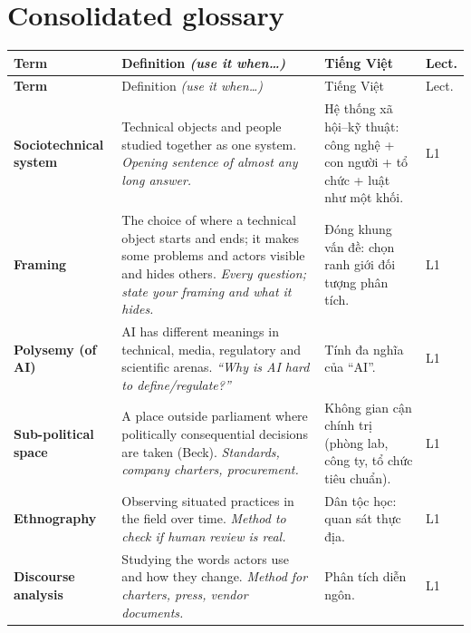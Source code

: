 \documentclass[11pt,a4paper]{article}
\begin{document}
\section{Consolidated glossary}{\small
\begin{longtable}{>{\RaggedRight\arraybackslash\bfseries}p{3.3cm}>{\RaggedRight\arraybackslash}p{5.1cm}>{\RaggedRight\arraybackslash}p{5.1cm}>{\centering\arraybackslash}p{0.8cm}}
\toprule Term & Definition \textit{(use it when…)} & Tiếng Việt & Lect.\\\midrule\endfirsthead\toprule Term & Definition \textit{(use it when…)} & Tiếng Việt & Lect.\\\midrule\endhead\bottomrule\endfoot
Sociotechnical system & Technical objects and people studied together as one system. \newline\textit{\color{teal}Opening sentence of almost any long answer.} & \textcolor{tipc}{Hệ thống xã hội–kỹ thuật: công nghệ + con người + tổ chức + luật như một khối.} & L1\\[3pt]
Framing & The choice of where a technical object starts and ends; it makes some problems and actors visible and hides others. \newline\textit{\color{teal}Every question; state your framing and what it hides.} & \textcolor{tipc}{Đóng khung vấn đề: chọn ranh giới đối tượng phân tích.} & L1\\[3pt]
Polysemy (of AI) & AI has different meanings in technical, media, regulatory and scientific arenas. \newline\textit{\color{teal}“Why is AI hard to define/regulate?”} & \textcolor{tipc}{Tính đa nghĩa của “AI”.} & L1\\[3pt]
Sub-political space & A place outside parliament where politically consequential decisions are taken (Beck). \newline\textit{\color{teal}Standards, company charters, procurement.} & \textcolor{tipc}{Không gian cận chính trị (phòng lab, công ty, tổ chức tiêu chuẩn).} & L1\\[3pt]
Ethnography & Observing situated practices in the field over time. \newline\textit{\color{teal}Method to check if human review is real.} & \textcolor{tipc}{Dân tộc học: quan sát thực địa.} & L1\\[3pt]
Discourse analysis & Studying the words actors use and how they change. \newline\textit{\color{teal}Method for charters, press, vendor documents.} & \textcolor{tipc}{Phân tích diễn ngôn.} & L1\\[3pt]

\end{longtable}}
\end{document}
